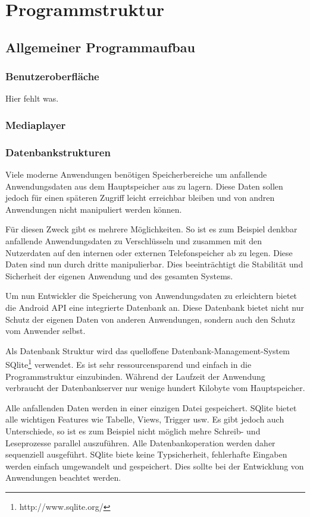 \section{Programmstruktur}
\subsection{Allgemeiner Programmaufbau}
\subsubsection{Benutzeroberfläche}
Hier fehlt was.
\subsubsection{Mediaplayer}
\subsubsection{Datenbankstrukturen}
\label{Datenbankstrukturen}
Viele moderne Anwendungen benötigen Speicherbereiche um anfallende Anwendungsdaten aus dem Hauptspeicher aus zu lagern. Diese Daten sollen jedoch für einen späteren Zugriff leicht erreichbar bleiben und von andren Anwendungen nicht manipuliert werden können.

Für diesen Zweck gibt es mehrere Möglichkeiten. So ist es zum Beispiel denkbar anfallende Anwendungsdaten zu Verschlüsseln und zusammen mit den Nutzerdaten auf den internen oder externen Telefonspeicher ab zu legen. Diese Daten sind nun durch dritte manipulierbar. Dies beeinträchtigt die Stabilität und Sicherheit der eigenen Anwendung und des gesamten Systems.

Um nun Entwickler die Speicherung von Anwendungsdaten zu erleichtern bietet die Android API eine integrierte Datenbank an. Diese Datenbank bietet nicht nur Schutz der eigenen Daten von anderen Anwendungen, sondern auch den Schutz vom Anwender selbst.

Als Datenbank Struktur wird das quelloffene Datenbank-Management-System SQlite\footnote{http://www.sqlite.org/} verwendet. Es ist sehr ressourcensparend und einfach in die Programmstruktur einzubinden. Während der Laufzeit der Anwendung verbraucht der Datenbankserver nur wenige hundert Kilobyte vom Hauptspeicher.

Alle anfallenden Daten werden in einer einzigen Datei gespeichert. SQlite bietet alle wichtigen Features wie Tabelle, Views, Trigger usw. Es gibt jedoch auch Unterschiede, so ist es zum Beispiel nicht möglich mehre Schreib- und Leseprozesse parallel auszuführen. Alle Datenbankoperation werden daher sequenziell ausgeführt. SQlite biete keine Typsicherheit, fehlerhafte Eingaben werden einfach umgewandelt und gespeichert. Dies sollte bei der Entwicklung von Anwendungen beachtet werden.

